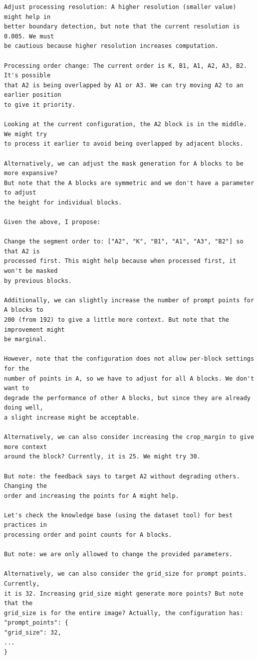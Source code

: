 \begin{lstlisting}[breaklines=true, basicstyle=\footnotesize\ttfamily, frame=single]
Adjust processing resolution: A higher resolution (smaller value) might help in 
better boundary detection, but note that the current resolution is 0.005. We must 
be cautious because higher resolution increases computation.

Processing order change: The current order is K, B1, A1, A2, A3, B2. It's possible 
that A2 is being overlapped by A1 or A3. We can try moving A2 to an earlier position 
to give it priority.

Looking at the current configuration, the A2 block is in the middle. We might try 
to process it earlier to avoid being overlapped by adjacent blocks.

Alternatively, we can adjust the mask generation for A blocks to be more expansive? 
But note that the A blocks are symmetric and we don't have a parameter to adjust 
the height for individual blocks.

Given the above, I propose:

Change the segment order to: ["A2", "K", "B1", "A1", "A3", "B2"] so that A2 is 
processed first. This might help because when processed first, it won't be masked 
by previous blocks.

Additionally, we can slightly increase the number of prompt points for A blocks to 
200 (from 192) to give a little more context. But note that the improvement might 
be marginal.

However, note that the configuration does not allow per-block settings for the 
number of points in A, so we have to adjust for all A blocks. We don't want to 
degrade the performance of other A blocks, but since they are already doing well, 
a slight increase might be acceptable.

Alternatively, we can also consider increasing the crop_margin to give more context 
around the block? Currently, it is 25. We might try 30.

But note: the feedback says to target A2 without degrading others. Changing the 
order and increasing the points for A might help.

Let's check the knowledge base (using the dataset tool) for best practices in 
processing order and point counts for A blocks.

But note: we are only allowed to change the provided parameters.

Alternatively, we can also consider the grid_size for prompt points. Currently, 
it is 32. Increasing grid_size might generate more points? But note that the 
grid_size is for the entire image? Actually, the configuration has:
"prompt_points": {
"grid_size": 32,
...
}


\end{lstlisting}
